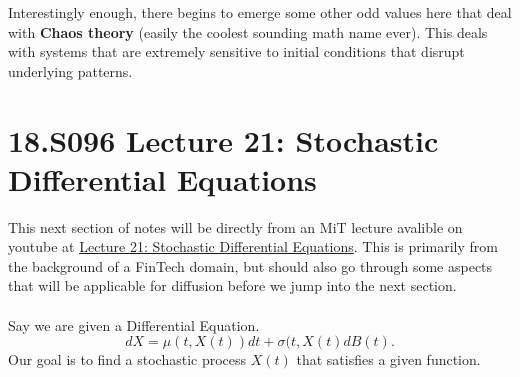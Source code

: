 \documentclass[10pt, oneside]{report}
\begin{document}
Interestingly enough, there begins to emerge some other odd values here that deal with \textbf{Chaos theory} (easily the coolest sounding math name ever).  This deals with systems that are extremely sensitive to initial conditions that disrupt underlying patterns.

\section{18.S096 Lecture 21: Stochastic Differential Equations}
This next section of notes will be directly from an MiT lecture avalible on youtube at \href{https://www.youtube.com/watch?v=qdbkvD4N-us}{Lecture 21: Stochastic Differential Equations}.  This is primarily from the background of a FinTech domain, but should also go through some aspects that will be applicable for diffusion before we jump into the next section.
\\
\\
Say we are given a Differential Equation.  
\[
    dX = \mu(t, X(t))dt + \sigma(t, X(t) dB(t)
.\] 
Our goal is to find a stochastic process $X(t)$ that satisfies a given function.  
\end{document}

